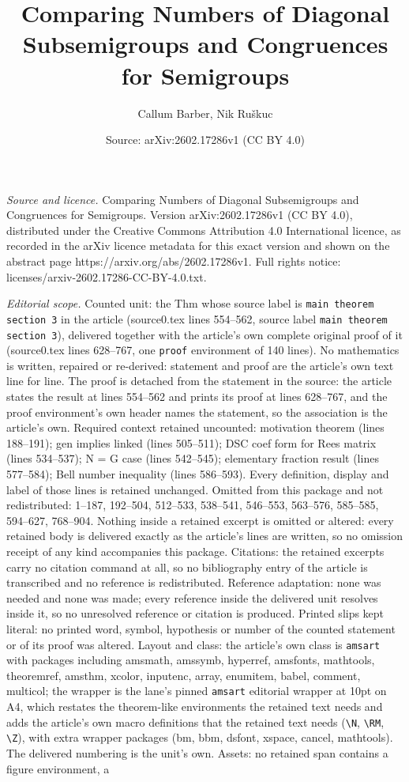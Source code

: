 \documentclass[10pt,a4paper]{amsart}
\title[Comparing Numbers of Diagonal Subsemigroups and Congruences ]{Comparing Numbers of Diagonal Subsemigroups and Congruences for Semigroups}
\author{Callum Barber, Nik Ru\v{s}kuc}
\date{Source: arXiv:2602.17286v1 (CC BY 4.0)}
\begin{document}
\maketitle

\noindent\emph{Source and licence.} Comparing Numbers of Diagonal Subsemigroups and Congruences for Semigroups. Version arXiv:2602.17286v1 (CC BY 4.0), distributed under the Creative Commons Attribution 4.0 International licence, as recorded in the arXiv licence metadata for this exact version and shown on the abstract page https://arxiv.org/abs/2602.17286v1. Full rights notice: licenses/arxiv-2602.17286-CC-BY-4.0.txt.\par\smallskip

\noindent\textit{Editorial scope.} Counted unit: the Thm whose source label is \texttt{main theorem section 3} in the article (source0.tex lines 554--562, source label \texttt{main theorem section 3}), delivered together with the article's own complete original proof of it (source0.tex lines 628--767, one \texttt{proof} environment of 140 lines). No mathematics is written, repaired or re-derived: statement and proof are the article's own text line for line. The proof is detached from the statement in the source: the article states the result at lines 554--562 and prints its proof at lines 628--767, and the proof environment's own header names the statement, so the association is the article's own. Required context retained uncounted: motivation theorem (lines 188--191); gen implies linked (lines 505--511); DSC coef form for Rees matrix (lines 534--537); N = G case (lines 542--545); elementary fraction result (lines 577--584); Bell number inequality (lines 586--593). Every definition, display and label of those lines is retained unchanged. Omitted from this package and not redistributed: 1--187, 192--504, 512--533, 538--541, 546--553, 563--576, 585--585, 594--627, 768--904. Nothing inside a retained excerpt is omitted or altered: every retained body is delivered exactly as the article's lines are written, so no omission receipt of any kind accompanies this package. Citations: the retained excerpts carry no citation command at all, so no bibliography entry of the article is transcribed and no reference is redistributed. Reference adaptation: none was needed and none was made; every reference inside the delivered unit resolves inside it, so no unresolved reference or citation is produced. Printed slips kept literal: no printed word, symbol, hypothesis or number of the counted statement or of its proof was altered. Layout and class: the article's own class is \texttt{amsart} with packages including amsmath, amssymb, hyperref, amsfonts, mathtools, theoremref, amsthm, xcolor, inputenc, array, enumitem, babel, comment, multicol; the wrapper is the lane's pinned \texttt{amsart} editorial wrapper at 10pt on A4, which restates the theorem-like environments the retained text needs and adds the article's own macro definitions that the retained text needs (\texttt{\textbackslash N}, \texttt{\textbackslash RM}, \texttt{\textbackslash Z}), with extra wrapper packages (bm, bbm, dsfont, xspace, cancel, mathtools). The delivered numbering is the unit's own. Assets: no retained span contains a figure environment, a 
\end{document}
